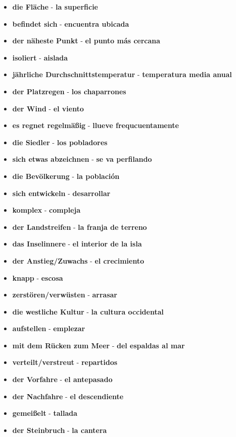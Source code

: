 \documentclass{article}
\begin{document}
\begin{multicols}{2}
	\newpage
	\begin{itemize}
		\item{\textbf{die Fläche} - \textbf{la superficie}}
		\item{\textbf{befindet sich} - \textbf{encuentra ubicada}}
		\item{\textbf{der näheste Punkt} - \textbf{el punto más cercana}}
		\item{\textbf{isoliert} - \textbf{aislada}}
		\item{\textbf{jährliche Durchschnittstemperatur} - \textbf{temperatura media anual}}
		\item{\textbf{der Platzregen} - \textbf{los chaparrones}}
		\item{\textbf{der Wind} - \textbf{el viento}}
		\item{\textbf{es regnet regelmäßig} - \textbf{llueve frequcuentamente}}
		\item{\textbf{die Siedler} - \textbf{los pobladores}}
		\item{\textbf{sich etwas abzeichnen} - \textbf{se va perfilando}}
		\item{\textbf{die Bevölkerung} - \textbf{la población}}
		\item{\textbf{sich entwickeln} - \textbf{desarrollar}}
		\item{\textbf{komplex} - \textbf{compleja}}
		\item{\textbf{der Landstreifen} - \textbf{la franja de terreno}}
		\item{\textbf{das Inselinnere} - \textbf{el interior de la isla}}
		\item{\textbf{der Anstieg/Zuwachs} - \textbf{el crecimiento}}
		\item{\textbf{knapp} - \textbf{escosa}}
		\item{\textbf{zerstören/verwüsten} - \textbf{arrasar}}
		\item{\textbf{die westliche Kultur} - \textbf{la cultura occidental}}
		\item{\textbf{aufstellen} - \textbf{emplezar}}
		\item{\textbf{mit dem Rücken zum Meer} - \textbf{del espaldas al mar}}
		\item{\textbf{verteilt/verstreut} - \textbf{repartidos}}
		\item{\textbf{der Vorfahre} - \textbf{el antepasado}}
		\item{\textbf{der Nachfahre} - \textbf{el descendiente}}
		\item{\textbf{gemeißelt} - \textbf{tallada}}
		\item{\textbf{der Steinbruch} - \textbf{la cantera}}

\end{itemize}
\end{multicols}
\end{document}
